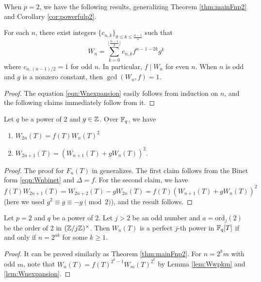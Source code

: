 When $p = 2$, we have the following results, generalizing Theorem \ref{thm:mainFnp2} and Corollary \ref{cor:powerfulp2}.
\begin{lemma}
    \label{lem:Wnexpansion}
    For each $n$, there exist integers $\{c_{n, k}\}_{0 \le k \le \frac{n-1}{2}}$ such that
    \begin{equation}
        \label{eqn:Wnexpansion}
        W_n = \sum_{k=0}^{\lfloor\frac{n-1}{2}\rfloor} c_{n, k} f^{n-1 - 2k} g^k
    \end{equation}
    where $c_{n, (n-1)/2} = 1$ for odd $n$.
    In particular, $f \mid W_{n}$ for even $n$.
    When $n$ is odd and $g$ is a nonzero constant, then $\gcd(W_{n}, f) = 1$.
\end{lemma}
\begin{proof}
    The equation \eqref{eqn:Wnexpansion} easily follows from induction on $n$, and the following claims immediately follow from it.
\end{proof}

\begin{lemma}
    \label{lem:Wnsquare}
    Let $q$ be a power of 2 and $g \in \mathbb{Z}$. Over $\mathbb{F}_q$, we have
    \begin{enumerate}
        \item $W_{2n}(T) = f(T) W_n(T)^2$
        \item $W_{2n+1}(T) = (W_{n+1}(T) + g W_{n}(T))^2$.
    \end{enumerate}
\end{lemma}
\begin{proof}
    The proof for $F_n(T)$ in \cite[Lemma 3.5]{kitayama2017irreducibility} generalizes.
    The first claim follows from the Binet form \eqref{eqn:Wnbinet} and $\Delta = f$. 
    For the second claim, we have $f(T) W_{2n+1}(T) = W_{2n+2}(T) - g W_{2n}(T) = f(T)(W_{n+1}(T) + g W_{n}(T))^2$ (here we used $g^2 \equiv g \equiv -g\pmod{2}$), and the result follows.
\end{proof}

\begin{theorem}
    Let $p = 2$ and $q$ be a power of 2.
    Let $j > 2$ be an odd number and $a = \mathrm{ord}_j(2)$ be the order of 2 in $(\mathbb{Z} / j\mathbb{Z})^\times$.
    Then $W_n(T)$ is a perfect $j$-th power in $\mathbb{F}_q[T]$ if and only if $n = 2^{ak}$ for some $k \ge 1$.
\end{theorem}
\begin{proof}
    It can be proved similarly as Theorem \ref{thm:mainFnp2}.
    For $n = 2^k m$ with odd $m$, note that $W_n(T) = f(T)^{2^k - 1} W_m(T)^{2^k}$ by Lemma \ref{lem:Wwpkm} and \ref{lem:Wnexpansion}.
\end{proof}


